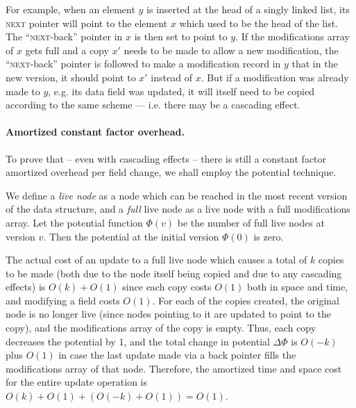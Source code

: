 For example, when an element $y$ is inserted at the head of a singly linked
list, its \textsc{next} pointer will point to the element $x$ which used to be
the head of the list. The ``\textsc{next}-back'' pointer in $x$ is then set to
point to $y$. If the modifications array of $x$ gets full and a copy $x'$ needs
to be made to allow a new modification, the ``\textsc{next}-back'' pointer is
followed to make a modification record in $y$ that in the new version, it should
point to $x'$ instead of $x$. But if a modification was already made to $y$,
e.g. its data field was updated, it will itself need to be copied according to
the same scheme --- i.e. there may be a cascading effect.

\paragraph{Amortized constant factor overhead.}
To prove that -- even with cascading effects -- there is still a constant factor
amortized overhead per field change, we shall employ the potential technique.

We define a \emph{live node} as a node which can be reached in the most recent
version of the data structure, and a \emph{full} live node as a live node with a
full modifications array. Let the potential function $\Phi(v)$ be the number of
full live nodes at version $v$. Then the potential at the initial version
$\Phi(0)$ is zero.

The actual cost of an update to a full live node which causes a total of $k$
copies to be made (both due to the node itself being copied and due to any
cascading effects) is $O(k) + O(1)$ since each copy costs $O(1)$ both in space
and time, and modifying a field costs $O(1)$. For each of the copies created,
the original node is no longer live (since nodes pointing to it are updated to
point to the copy), and the modifications array of the copy is empty. Thus, each
copy decreases the potential by 1, and the total change in potential
$\Delta\Phi$ is $O(-k)$ plus $O(1)$ in case the last update made via a back
pointer fills the modifications array of that node. Therefore, the amortized
time and space cost for the entire update operation is $O(k) + O(1) + (O(-k) +
O(1)) = O(1)$.

% 
% 


